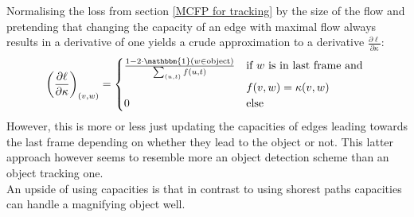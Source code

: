 \documentclass{article}
\begin{document}
{Normalising the loss from section \ref{MCFP for tracking} by the size of the flow and pretending that changing the capacity of an edge with maximal flow always results in a derivative of one yields a crude approximation to a derivative $\frac{\partial \ell}{\partial \kappa}$:
\begin{align*}
\left(\frac{\partial \ell}{\partial \kappa}\right)_{(v,w)} = 
\begin{cases}
\frac{1 - 2 \cdot \mathbbm{1}(w\in \textnormal{object})}{\sum_{(u,t)} f(u,t)} &\textnormal{if } w \textnormal{ is in last frame and }\\
& f(v,w) = \kappa(v,w)\\
0 &\textnormal{else}
\end{cases}
\end{align*}
However, this is more or less just updating the capacities of edges leading towards the last frame depending on whether they lead to the object or not. This latter approach however seems to resemble more an object detection scheme than an object tracking one.\\
An upside of using capacities is that in contrast to using shorest paths capacities can handle a magnifying object well.

}
\end{document}
